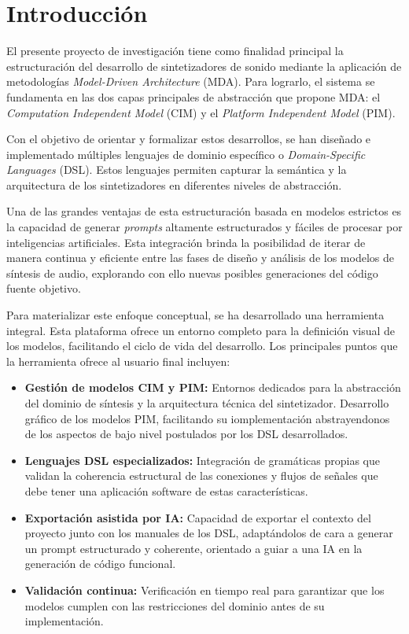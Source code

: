\chapter{Introducción}

El presente proyecto de investigación tiene como finalidad principal la estructuración del desarrollo de sintetizadores de sonido mediante la aplicación de metodologías \textit{Model-Driven Architecture} (MDA). Para lograrlo, el sistema se fundamenta en las dos capas principales de abstracción que propone MDA: el \textit{Computation Independent Model} (CIM) y el \textit{Platform Independent Model} (PIM).

Con el objetivo de orientar y formalizar estos desarrollos, se han diseñado e implementado múltiples lenguajes de dominio específico o \textit{Domain-Specific Languages} (DSL). Estos lenguajes permiten capturar la semántica y la arquitectura de los sintetizadores en diferentes niveles de abstracción.

Una de las grandes ventajas de esta estructuración basada en modelos estrictos es la capacidad de generar \textit{prompts} altamente estructurados y fáciles de procesar por inteligencias artificiales. Esta integración brinda la posibilidad de iterar de manera continua y eficiente entre las fases de diseño y análisis de los modelos de síntesis de audio, explorando con ello nuevas posibles generaciones del código fuente objetivo.

Para materializar este enfoque conceptual, se ha desarrollado una herramienta integral. Esta plataforma ofrece un entorno completo para la definición visual de los modelos, facilitando el ciclo de vida del desarrollo. Los principales puntos que la herramienta ofrece al usuario final incluyen:

\begin{itemize}
    \item \textbf{Gestión de modelos CIM y PIM:} Entornos dedicados para la abstracción del dominio de síntesis y la arquitectura técnica del sintetizador. Desarrollo gráfico de los modelos PIM, facilitando su iomplementación abstrayendonos de los aspectos de bajo nivel postulados por los DSL desarrollados.
    \item \textbf{Lenguajes DSL especializados:} Integración de gramáticas propias que validan la coherencia estructural de las conexiones y flujos de señales que debe tener una aplicación software de estas características.
    \item \textbf{Exportación asistida por IA:} Capacidad de exportar el contexto del proyecto junto con los manuales de los DSL, adaptándolos de cara a generar un prompt estructurado y coherente, orientado a guiar a una IA en la generación de código funcional.
    \item \textbf{Validación continua:} Verificación en tiempo real para garantizar que los modelos cumplen con las restricciones del dominio antes de su implementación.
\end{itemize}

